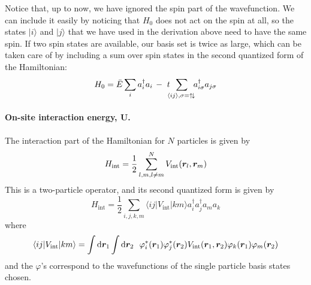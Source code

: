 Notice that, up to now, we have ignored the spin part of the wavefunction.   We
can include it easily by noticing that $H_{0}$ does not act on the spin at all,
so the states $|i\rangle$ and $|j\rangle$ that we have used in the derivation
above need to have the same spin.   If two spin states are available, our basis
set is twice as large, which can be taken care of by including a sum over spin
states in the second quantized form of the Hamiltonian:
\begin{equation}
  H_{0} = \bar{E}\sum_{i}  a_{i}^{\dagger} a_{i} \, -\ t
   \!\!\! 
  \sum_{ \langle ij \rangle, \sigma= \uparrow\! \downarrow \,    } 
   \!\!\!
  a_{i\sigma}^{\dagger}a_{j\sigma} 
\end{equation}

\paragraph{On-site interaction energy, $\bm{U}$.}

The interaction part of the Hamiltonian for $N$ particles is
given by \begin{equation}
    H_{\text{int}} = 
         \frac{1}{2}\sum_{ l,m, l\neq m}^{N} 
         V_{\mathrm{int}}(\bm{r}_{l},\bm{r}_{m} )\\ 
\end{equation}
This is a two-particle operator, and its second quantized form is given by
\begin{equation}
   H_{\text{int}} = \frac{1}{2} \sum_{i,j,k,m} 
           \langle ij | V_{\mathrm{int}} | km \rangle
           a_{i}^{\dagger} a_{j}^{\dagger} a_{m} a_{k}
\end{equation}
where 
\begin{equation}
    \langle ij | V_{\mathrm{int}} | km \rangle =
    \int \mathrm{d}\bm{r}_{1} \int \mathrm{d}\bm{r}_{2} \ \  
    \varphi_{i}^{*}(\bm{r}_{1}) \varphi_{j}^{*}(\bm{r}_{2}) 
    V_{\mathrm{int}}(\bm{r}_{1},\bm{r}_{2}) 
    \varphi_{k}(\bm{r}_{1}) \varphi_{m}(\bm{r}_{2}) 
\end{equation}
and the $\varphi$'s correspond to the wavefunctions of the single particle
basis states chosen. 

